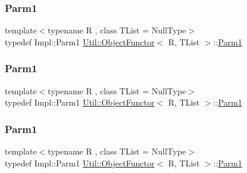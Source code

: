 \mbox{\label{classUtil_1_1ObjectFunctor_a199715d28029627c2ae7219c13b04d26}} 
\subsubsection{\texorpdfstring{Parm1}{Parm1}\hspace{0.1cm}{\footnotesize\ttfamily [1/3]}}
{\footnotesize\ttfamily template$<$typename R , class T\+List  = Null\+Type$>$ \\
typedef Impl\+::\+Parm1 \mbox{\hyperlink{classUtil_1_1ObjectFunctor}{Util\+::\+Object\+Functor}}$<$ R, T\+List $>$\+::\mbox{\hyperlink{classUtil_1_1ObjectFunctor_a199715d28029627c2ae7219c13b04d26}{Parm1}}}

\mbox{\label{classUtil_1_1ObjectFunctor_a199715d28029627c2ae7219c13b04d26}} 
\subsubsection{\texorpdfstring{Parm1}{Parm1}\hspace{0.1cm}{\footnotesize\ttfamily [2/3]}}
{\footnotesize\ttfamily template$<$typename R , class T\+List  = Null\+Type$>$ \\
typedef Impl\+::\+Parm1 \mbox{\hyperlink{classUtil_1_1ObjectFunctor}{Util\+::\+Object\+Functor}}$<$ R, T\+List $>$\+::\mbox{\hyperlink{classUtil_1_1ObjectFunctor_a199715d28029627c2ae7219c13b04d26}{Parm1}}}

\mbox{\label{classUtil_1_1ObjectFunctor_a199715d28029627c2ae7219c13b04d26}} 
\subsubsection{\texorpdfstring{Parm1}{Parm1}\hspace{0.1cm}{\footnotesize\ttfamily [3/3]}}
{\footnotesize\ttfamily template$<$typename R , class T\+List  = Null\+Type$>$ \\
typedef Impl\+::\+Parm1 \mbox{\hyperlink{classUtil_1_1ObjectFunctor}{Util\+::\+Object\+Functor}}$<$ R, T\+List $>$\+::\mbox{\hyperlink{classUtil_1_1ObjectFunctor_a199715d28029627c2ae7219c13b04d26}{Parm1}}}

